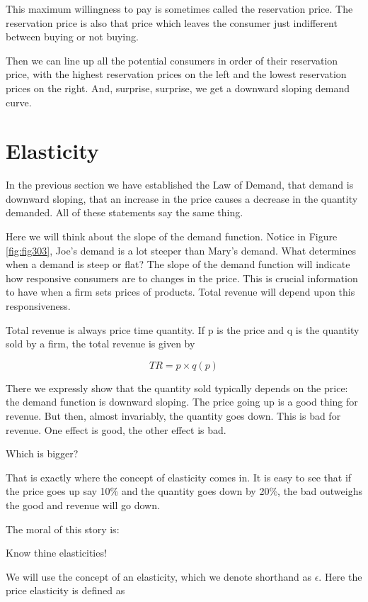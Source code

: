 \documentclass[
]{book}
\begin{document}
This maximum willingness to pay is sometimes called the reservation price. The reservation price is also that price which leaves the consumer just indifferent between buying or not buying.

Then we can line up all the potential consumers in order of their reservation price, with the highest reservation prices on the left and the lowest reservation prices on the right. And, surprise, surprise, we get a downward sloping demand curve.

\hypertarget{elasticity}{%
\section{Elasticity}\label{elasticity}}

In the previous section we have established the Law of Demand, that demand is downward sloping, that an increase in the price causes a decrease in the quantity demanded. All of these statements say the same thing.

Here we will think about the slope of the demand function. Notice in Figure \ref{fig:fig303}, Joe's demand is a lot steeper than Mary's demand. What determines when a demand is steep or flat? The slope of the demand function will indicate how responsive consumers are to changes in the price. This is crucial information to have when a firm sets prices of products. Total revenue will depend upon this responsiveness.

Total revenue is always price time quantity. If p is the price and q is the quantity sold by a firm, the total revenue is given by

\[TR = p \times q(p)\]

There we expressly show that the quantity sold typically depends on the price: the demand function is downward sloping. The price going up is a good thing for revenue. But then, almost invariably, the quantity goes down. This is bad for revenue. One effect is good, the other effect is bad.

Which is bigger?

That is exactly where the concept of elasticity comes in. It is easy to see that if the price goes up say 10\% and the quantity goes down by 20\%, the bad outweighs the good and revenue will go down.

The moral of this story is:

Know thine elasticities!

We will use the concept of an elasticity, which we denote shorthand as \(\epsilon\). Here the price elasticity is defined as
\end{document}
